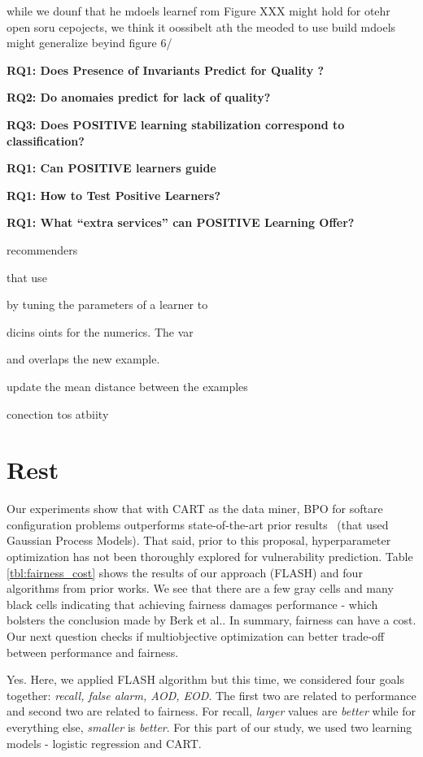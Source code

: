 while we dounf that he mdoels learnef rom Figure XXX might hold for otehr open soru cepojects, we think it oossibelt ath the meoded to use build mdoels might generalize beyind figure 6/

{\bf RQ1: Does Presence of Invariants Predict for Quality ?}

{\bf RQ2: Do anomaies predict
for lack of quality?}

{\bf RQ3: Does POSITIVE learning
stabilization correspond to classification?}

{\bf RQ1: Can POSITIVE learners guide }


{\bf RQ1: How to Test Positive Learners?}

{\bf RQ1: What ``extra services'' can POSITIVE Learning Offer?}

recommenders
  
  
  that use

by tuning the parameters of a learner to


dicins oints for the numerics.
The var

  
  and overlaps the new example.

update the mean distance between the examples 

conection tos atbiity


\section{Rest}
Our experiments show that with  CART as the data miner,
BPO for softare configuration problems outperforms  state-of-the-art 
prior results~\cite{zuluaga2016varepsilon} (that used
Gaussian Process Models). 
That said,
prior to this proposal, hyperparameter optimization has not been thoroughly explored
for  vulnerability prediction. 
Table \ref{tbl:fairness_cost} shows the results of our approach (FLASH) and four algorithms from prior works. We see that there are a few gray cells and many black cells indicating that achieving fairness damages performance - which bolsters the conclusion made by Berk et al.\cite{berk2017convex}. In summary,  fairness can have a cost. Our next question checks if multiobjective optimization can better trade-off between performance and fairness.  


Yes. Here, we applied  FLASH algorithm but this time, we considered four goals together: \textit{recall, false alarm, AOD, EOD}. The first two are related to performance and second two are related to fairness. For
recall, {\em larger} values are {\em better} while for everything
else, {\em smaller} is {\em better}.
 For this part of our study, we used two learning models - logistic regression and CART. 
 
